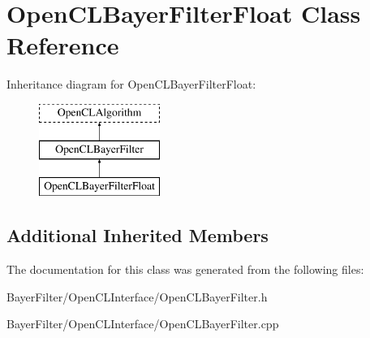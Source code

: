 \hypertarget{class_open_c_l_bayer_filter_float}{\section{Open\-C\-L\-Bayer\-Filter\-Float Class Reference}
\label{class_open_c_l_bayer_filter_float}
}
Inheritance diagram for Open\-C\-L\-Bayer\-Filter\-Float\-:\begin{figure}[H]
\begin{center}
\leavevmode
\includegraphics[height=3.000000cm]{class_open_c_l_bayer_filter_float}
\end{center}
\end{figure}
\subsection*{Additional Inherited Members}


The documentation for this class was generated from the following files\-:\begin{DoxyCompactItemize}
\item 
Bayer\-Filter/\-Open\-C\-L\-Interface/Open\-C\-L\-Bayer\-Filter.\-h\item 
Bayer\-Filter/\-Open\-C\-L\-Interface/Open\-C\-L\-Bayer\-Filter.\-cpp\end{DoxyCompactItemize}
